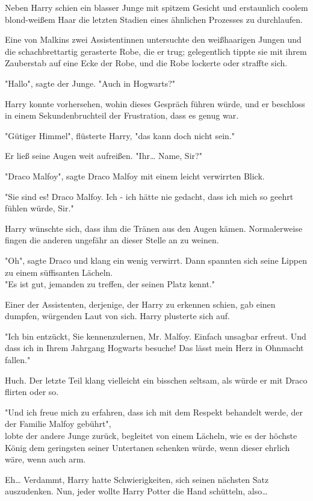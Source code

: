 {Neben Harry schien ein blasser Junge mit spitzem Gesicht und erstaunlich coolem blond-weißem Haar die letzten Stadien eines ähnlichen Prozesses zu durchlaufen.

Eine von Malkins zwei Assistentinnen untersuchte den weißhaarigen Jungen und die schachbrettartig gerasterte Robe, die er trug; gelegentlich tippte sie mit ihrem Zauberstab auf eine Ecke der Robe, und die Robe lockerte oder straffte sich.

"Hallo", sagte der Junge. "Auch in Hogwarts?"

Harry konnte vorhersehen, wohin dieses Gespräch führen würde, und er beschloss in einem Sekundenbruchteil der Frustration, dass es genug war.

"Gütiger Himmel", flüsterte Harry, "das kann doch nicht sein."

Er ließ seine Augen weit aufreißen. "Ihr… Name, Sir?"

"Draco Malfoy", sagte Draco Malfoy mit einem leicht verwirrten Blick.

"Sie sind es! Draco Malfoy. Ich - ich hätte nie gedacht, dass ich mich so geehrt fühlen würde, Sir."

Harry wünschte sich, dass ihm die Tränen aus den Augen kämen. Normalerweise fingen die anderen ungefähr an dieser Stelle an zu weinen.

"Oh", sagte Draco und klang ein wenig verwirrt. Dann spannten sich seine Lippen zu einem süffisanten Lächeln.\\ "Es ist gut, jemanden zu treffen, der seinen Platz kennt."

Einer der Assistenten, derjenige, der Harry zu erkennen schien, gab einen dumpfen, würgenden Laut von sich. Harry plusterte sich auf.

"Ich bin entzückt, Sie kennenzulernen, Mr. Malfoy. Einfach unsagbar erfreut. Und dass ich in Ihrem Jahrgang Hogwarts besuche! Das lässt mein Herz in Ohnmacht fallen."

Huch. Der letzte Teil klang vielleicht ein bisschen seltsam, als würde er mit Draco flirten oder so.

"Und ich freue mich zu erfahren, dass ich mit dem Respekt behandelt werde, der der Familie Malfoy gebührt",\\ lobte der andere Junge zurück, begleitet von einem Lächeln, wie es der höchste König dem geringsten seiner Untertanen schenken würde, wenn dieser ehrlich wäre, wenn auch arm.

Eh… Verdammt, Harry hatte Schwierigkeiten, sich seinen nächsten Satz auszudenken. Nun, jeder wollte Harry Potter die Hand schütteln, also…

}
